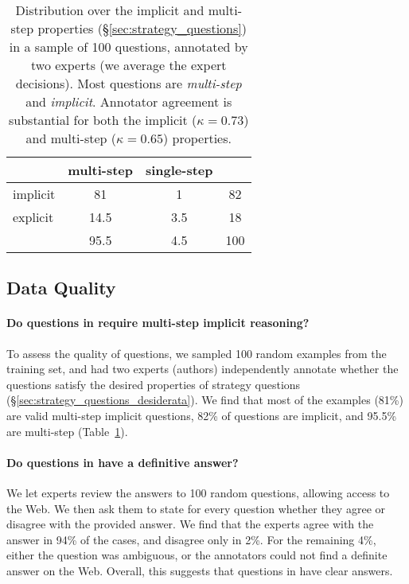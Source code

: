 {\begin{table}[t]
    \centering
    \footnotesize
    \begin{tabular}{l|c|c|c}
        & multi-step & single-step &  \\ \hline
      implicit  & 81 & 1 & 82 \\ \hline
      explicit  & 14.5 & 3.5 & 18 \\ \hline
       & 95.5 & 4.5 & 100
    \end{tabular}
    \caption{Distribution over the implicit and multi-step properties (\S\ref{sec:strategy_questions}) in a sample of 100 \strategyqa{} questions, annotated by two experts (we average the expert decisions).
    Most questions are \emph{multi-step} and \emph{implicit}. Annotator agreement is substantial for both the implicit ($\kappa = 0.73$) and multi-step ($\kappa = 0.65$) properties. 
    }
    \label{table:quality_stats}
\end{table}

\subsection{Data Quality}
\label{subsec:data_quality}

\paragraph{Do questions in \strategyqa{} require multi-step implicit reasoning?}
To assess the quality of questions, we sampled 100 random examples from the training set, and had two experts (authors) independently annotate whether the questions satisfy the desired properties of strategy questions (\S\ref{sec:strategy_questions_desiderata}).
We find that most of the examples (81\%) are valid multi-step implicit questions, 82\% of questions are implicit, and 95.5\% are multi-step (Table~\ref{table:quality_stats}).

\paragraph{Do questions in \strategyqa{} have a definitive answer?}
We let experts review the answers to 100 random questions, allowing access to the Web. We then ask them to state for every question whether they agree or disagree with the provided answer. We find that the experts agree with the answer in 94\% of the cases, and disagree only in 2\%. For the remaining 4\%, either the question was ambiguous, or the annotators could not find a definite answer on the Web. Overall,
this suggests that questions in \strategyqa{} have clear answers.

}
